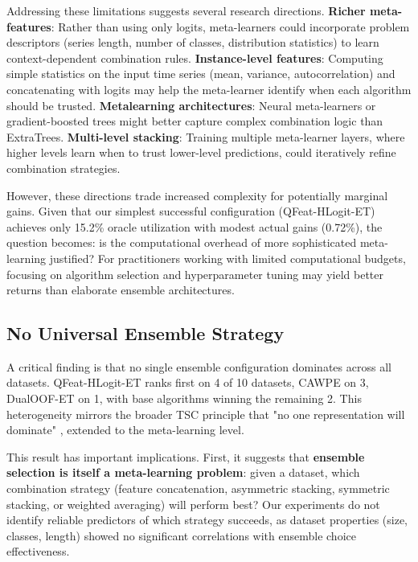 \documentclass[pdflatex,sn-basic]{sn-jnl}           %
\theoremstyle{thmstyleone}%
\theoremstyle{thmstyletwo}%
\theoremstyle{thmstylethree}%
\begin{document}
Addressing these limitations suggests several research directions. \textbf{Richer meta-features}: Rather than using only logits, meta-learners could incorporate problem descriptors (series length, number of classes, distribution statistics) to learn context-dependent combination rules. \textbf{Instance-level features}: Computing simple statistics on the input time series (mean, variance, autocorrelation) and concatenating with logits may help the meta-learner identify when each algorithm should be trusted. \textbf{Metalearning architectures}: Neural meta-learners or gradient-boosted trees might better capture complex combination logic than ExtraTrees. \textbf{Multi-level stacking}: Training multiple meta-learner layers, where higher levels learn when to trust lower-level predictions, could iteratively refine combination strategies.

However, these directions trade increased complexity for potentially marginal gains. Given that our simplest successful configuration (QFeat-HLogit-ET) achieves only 15.2\% oracle utilization with modest actual gains (0.72\%), the question becomes: is the computational overhead of more sophisticated meta-learning justified? For practitioners working with limited computational budgets, focusing on algorithm selection and hyperparameter tuning may yield better returns than elaborate ensemble architectures.

\subsection{No Universal Ensemble Strategy}

A critical finding is that no single ensemble configuration dominates across all datasets. QFeat-HLogit-ET ranks first on 4 of 10 datasets, CAWPE on 3, DualOOF-ET on 1, with base algorithms winning the remaining 2. This heterogeneity mirrors the broader TSC principle that "no one representation will dominate" \citep{tsc-bakeoff}, extended to the meta-learning level.

This result has important implications. First, it suggests that \textbf{ensemble selection is itself a meta-learning problem}: given a dataset, which combination strategy (feature concatenation, asymmetric stacking, symmetric stacking, or weighted averaging) will perform best? Our experiments do not identify reliable predictors of which strategy succeeds, as dataset properties (size, classes, length) showed no significant correlations with ensemble choice effectiveness.
\end{document}
